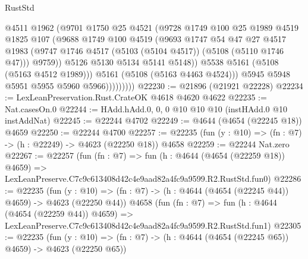 \begin{lexlean}{RustStd}
\begin{coremodule}
                          @4511
                          @1962
                          (@9701
                            @1750
                            @25
                            @4521
                            (@9728
                              @1749
                              @100
                              @25
                              @1989
                              @4519
                              @1825
                              @107
                              (@9688
                                @1749
                                @100
                                @4519
                                (@9693
                                  @1747
                                  @54
                                  @47
                                  @27
                                  @4517
                                  @1983
                                  (@9747
                                    @1746
                                    @4517
                                    (@5103 (@5104 @4517))
                                    (@5108 (@5110 @1746 @47)))
                                  @9759))
                              @5126
                              @5130
                              @5134
                              @5141
                              @5148))
                          @5538
                          @5161
                          (@5108 (@5163 @4512 @1989)))
                        @5161
                        (@5108 (@5163 @4463 @4524)))
                      @5945
                      @5948
                      @5951
                      @5955
                      @5960
                      @5966)))))))))
@22230 := @21896 (@21921 @22228)
@22234 := LexLeanPreservation.Rust.CrateOK @4618 @4620 @4622
@22235 := Nat.casesOn.{0}
@22244 := HAdd.hAdd.{0, 0, 0} @10 @10 @10 (instHAdd.{0} @10 instAddNat)
@22245 := @22244 @4702
@22249 := @4644 (@4654 (@22245 @18)) @4659
@22250 := @22244 @4700
@22257 := @22235 (fun (y : @10) => (fn : @7) -> (h : @22249) -> @4623 (@22250 @18)) @4658
@22259 := @22244 Nat.zero
@22267 := @22257
    (fun (fn : @7) =>
    fun (h : @4644 (@4654 (@22259 @18)) @4659) =>
    LexLeanPreserve.C7c9c613408d42c4e9aad82a4fc9a9599.R2.RustStd.fun0)
@22286 := @22235
    (fun (y : @10) => (fn : @7) -> (h : @4644 (@4654 (@22245 @44)) @4659) -> @4623 (@22250 @44))
    @4658
    (fun (fn : @7) =>
    fun (h : @4644 (@4654 (@22259 @44)) @4659) =>
    LexLeanPreserve.C7c9c613408d42c4e9aad82a4fc9a9599.R2.RustStd.fun1)
@22305 := @22235
    (fun (y : @10) => (fn : @7) -> (h : @4644 (@4654 (@22245 @65)) @4659) -> @4623 (@22250 @65))

\end{coremodule}
\end{lexlean}
